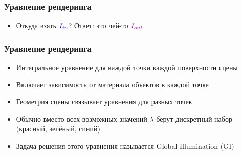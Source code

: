 \documentclass{beamer}
\begin{document}
\begin{frame}[fragile]
\frametitle{Уравнение рендеринга}
\begin{itemize}
\item Откуда взять \begin{math}{\color{blue}I_{in}}\end{math}? \pause Ответ: это чей-то \begin{math}{\color{magenta}I_{out}}\end{math} 
\end{itemize}
\begin{center}
\end{center}
\end{frame}

\begin{frame}[fragile]
\frametitle{Уравнение рендеринга}
\begin{itemize}
\item Интегральное уравнение для каждой точки каждой поверхности сцены
\pause
\item Включает зависимость от материала объектов в каждой точке
\pause
\item Геометрия сцены связывает уравнения для разных точек
\pause
\item Обычно вместо всех возможных значений \begin{math}\lambda\end{math} берут дискретный набор ({\color{red}красный}, {\color{green}зелёный}, {\color{blue}синий})
\pause
\item Задача решения этого уравнения называется Global Illumination (GI)
\end{itemize}
\end{frame}
\end{document}
